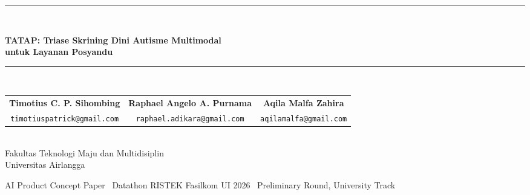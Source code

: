\documentclass[10pt,letterpaper]{article}
\newcommand{\produk}{TATAP}
\begin{document}
\thispagestyle{empty}
\vspace*{1.2cm}

\begin{center}
\rule{\textwidth}{1.2pt}\\[0.7em]
{\LARGE\bfseries \produk: Triase Skrining Dini Autisme Multimodal\\[3pt]
untuk Layanan Posyandu\par}
\vspace{0.7em}
\rule{\textwidth}{0.5pt}\\[2em]
{\normalsize
\begin{tabular}{ccc}
\textbf{Timotius C. P. Sihombing} & \textbf{Raphael Angelo A. Purnama} &
\textbf{Aqila Malfa Zahira} \\[2pt]
\texttt{\small timotiuspatrick@gmail.com} &
\texttt{\small raphael.adikara@gmail.com} &
\texttt{\small aqilamalfa@gmail.com}
\end{tabular}\\[8pt]
Fakultas Teknologi Maju dan Multidisiplin\\
Universitas Airlangga\par}
\end{center}

\vfill
\begin{center}
{\small AI Product Concept Paper \textbullet\ Datathon RISTEK Fasilkom UI 2026
\textbullet\ Preliminary Round, University Track\par}
\end{center}

\newpage
\setcounter{page}{1}
\end{document}
